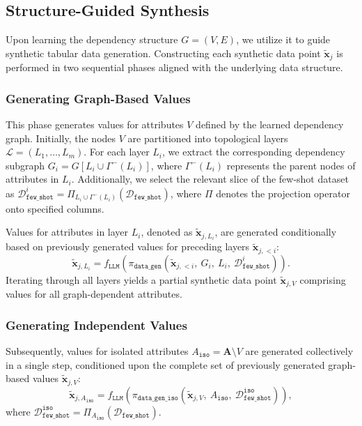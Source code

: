 \subsection{Structure-Guided Synthesis}

Upon learning the dependency structure $G=(V, E)$, we utilize it to guide synthetic tabular data generation. Constructing each synthetic data point $\tilde{\mathbf{x}}_j$ is performed in two sequential phases aligned with the underlying data structure.

\subsubsection{Generating Graph-Based Values}

This phase generates values for attributes $V$ defined by the learned dependency graph. Initially, the nodes $V$ are partitioned into topological layers $\mathcal{L} = (L_1, \dots, L_m)$. For each layer $L_i$, we extract the corresponding dependency subgraph $G_i = G[L_i \cup \Gamma^{-}(L_i)]$, where $\Gamma^{-}(L_i)$ represents the parent nodes of attributes in $L_i$. Additionally, we select the relevant slice of the few-shot dataset as $\mathcal{D}_{\mathtt{few\_shot}}^i = \Pi_{L_i \cup \Gamma^{-}(L_i)}(\mathcal{D}_{\mathtt{few\_shot}})
$, where $\Pi$ denotes the projection operator onto specified columns.

Values for attributes in layer $L_i$, denoted as $\tilde{\mathbf{x}}_{j, L_i}$, are generated conditionally based on previously generated values for preceding layers $\tilde{\mathbf{x}}_{j, <i}$:
\begin{equation}
\tilde{\mathbf{x}}_{j, L_i} = f_{\mathtt{LLM}}\left(\pi_{\mathtt{data\_gen}}\left( \tilde{\mathbf{x}}_{j, <i},\ G_i,\ L_i,\ \mathcal{D}_{\mathtt{few\_shot}}^i\right)\right).
\end{equation}
Iterating through all layers yields a partial synthetic data point $\tilde{\mathbf{x}}_{j, V}$ comprising values for all graph-dependent attributes.

\subsubsection{Generating Independent Values}

Subsequently, values for isolated attributes $A_{\mathtt{iso}} = \mathbf{A} \setminus V$ are generated collectively in a single step, conditioned upon the complete set of previously generated graph-based values $\tilde{\mathbf{x}}_{j, V}$:
\begin{equation}
\tilde{\mathbf{x}}_{j, A_{\mathtt{iso}}} = f_{\mathtt{LLM}}\left(\pi_{\mathtt{data\_gen\_iso}}\left(\tilde{\mathbf{x}}_{j, V},\ A_{\mathtt{iso}},\ \mathcal{D}_{\mathtt{few\_shot}}^{\mathtt{iso}}\right)\right),
\end{equation}
where $\mathcal{D}_{\mathtt{few\_shot}}^{\mathtt{iso}} = \Pi_{A_{\mathtt{iso}}}(\mathcal{D}_{\mathtt{few\_shot}}).$

